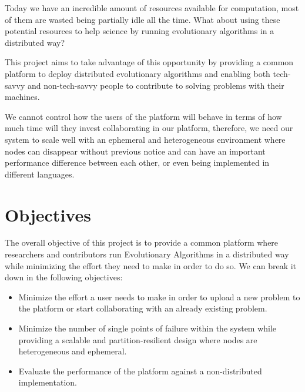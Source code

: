 Today we have an incredible amount of resources available for computation, most of them are wasted being partially idle all the time. What about using these potential resources to help science by running evolutionary algorithms in a distributed way?

This project aims to take advantage of this opportunity by providing a common platform to deploy distributed evolutionary algorithms and enabling both tech-savvy and non-tech-savvy people to contribute to solving problems with their machines.

We cannot control how the users of the platform will behave in terms of how much time will they invest collaborating in our platform, therefore, we need our system to scale well with an ephemeral and heterogeneous environment where nodes can disappear without previous notice and can have an important performance difference between each other, or even being implemented in different languages. 


\section{Objectives}
The overall objective of this project is to provide a common platform where researchers and contributors run Evolutionary Algorithms in a distributed way while minimizing the effort they need to make in order to do so. We can break it down in the following objectives:

\begin{itemize}
    \item Minimize the effort a user needs to make in order to upload a new problem to the platform or start collaborating with an already existing problem. 
    
    \item Minimize the number of single points of failure within the system while providing a scalable and partition-resilient design where nodes are heterogeneous and ephemeral.
    
    \item Evaluate the performance of the platform against a non-distributed implementation.
\end{itemize}
